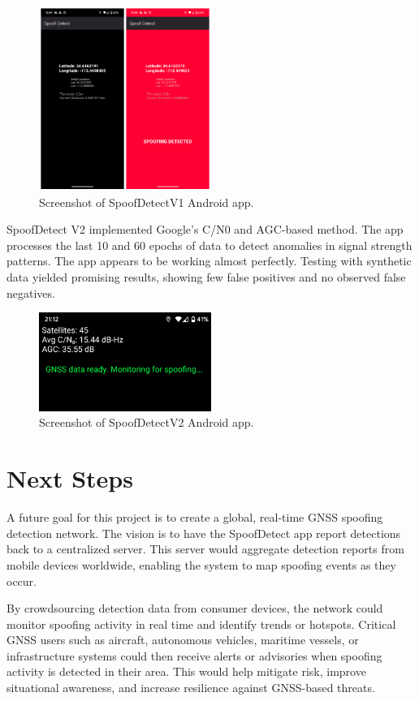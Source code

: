 \documentclass[conference]{IEEEtran}
\begin{document}
\begin{figure}[htbp]
    \centerline{\includegraphics[width=0.5\textwidth]{figs/spoofdetect_app.png}}
    \caption{Screenshot of SpoofDetectV1 Android app.}
   \end{figure}

SpoofDetect V2 implemented Google’s C/N0 and AGC-based method. The app processes the last 10 and 60 epochs of data to detect anomalies in signal strength patterns. The app appears to be working almost perfectly. Testing with synthetic data yielded promising results, showing few false positives and no observed false negatives.

\begin{figure}[htbp]
    \centerline{\includegraphics[width=0.5\textwidth]{figs/spoofdetectv2.png}}
    \caption{Screenshot of SpoofDetectV2 Android app.}
   \end{figure}

\section{Next Steps}
A future goal for this project is to create a global, real-time GNSS spoofing detection network. The vision is to have the SpoofDetect app report detections back to a centralized server. This server would aggregate detection reports from mobile devices worldwide, enabling the system to map spoofing events as they occur.

By crowdsourcing detection data from consumer devices, the network could monitor spoofing activity in real time and identify trends or hotspots. Critical GNSS users such as aircraft, autonomous vehicles, maritime vessels, or infrastructure systems could then receive alerts or advisories when spoofing activity is detected in their area. This would help mitigate risk, improve situational awareness, and increase resilience against GNSS-based threats.
\end{document}

